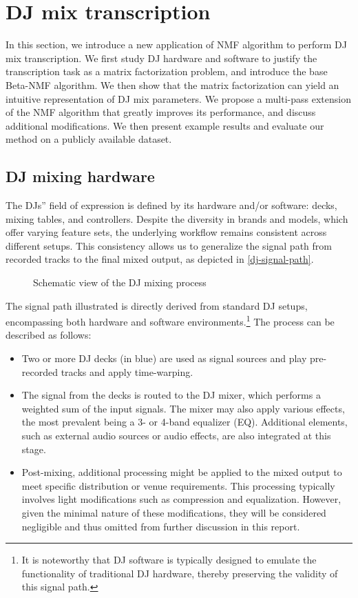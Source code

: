 \section{DJ mix transcription}

In this section, we introduce a new application of NMF algorithm to
perform DJ mix transcription. We first study DJ hardware and software to
justify the transcription task as a matrix factorization problem, and
introduce the base Beta-NMF algorithm. We then show that the matrix
factorization can yield an intuitive representation of DJ mix
parameters. We propose a multi-pass extension of the NMF algorithm that
greatly improves its performance, and discuss additional modifications.
We then present example results and evaluate our method on a publicly
available dataset.

\subsection{DJ mixing hardware}

The DJs'' field of expression is defined by its hardware and/or
software: decks, mixing tables, and controllers. Despite the diversity
in brands and models, which offer varying feature sets, the underlying
workflow remains consistent across different setups. This consistency
allows us to generalize the signal path from recorded tracks to the
final mixed output, as depicted in
\hyperref[dj-signal-path]{{[}dj-signal-path{]}}.

\begin{figure}
\centering

\caption{Schematic view of the DJ mixing process}
\end{figure}

\label{dj-signal-path}{}

The signal path illustrated is directly derived from standard DJ setups,
encompassing both hardware and software environments.\footnote{It is
  noteworthy that DJ software is typically designed to emulate the
  functionality of traditional DJ hardware, thereby preserving the
  validity of this signal path.} The process can be described as
follows:

\begin{itemize}
\item
  Two or more DJ decks (in blue) are used as signal sources and play
  pre-recorded tracks and apply time-warping.
\item
  The signal from the decks is routed to the DJ mixer, which performs a
  weighted sum of the input signals. The mixer may also apply various
  effects, the most prevalent being a 3- or 4-band equalizer (EQ).
  Additional elements, such as external audio sources or audio effects,
  are also integrated at this stage.
\item
  Post-mixing, additional processing might be applied to the mixed
  output to meet specific distribution or venue requirements. This
  processing typically involves light modifications such as compression
  and equalization. However, given the minimal nature of these
  modifications, they will be considered negligible and thus omitted
  from further discussion in this report.
\end{itemize}

